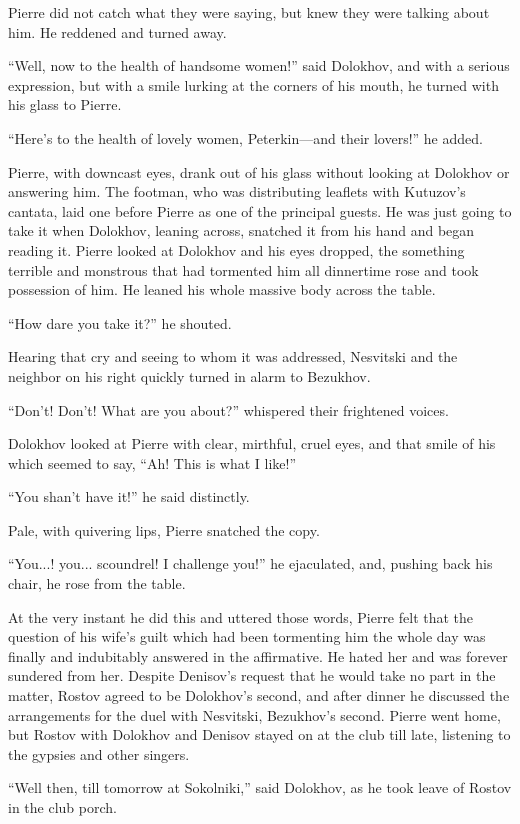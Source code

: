 Pierre did not catch what they were saying, but knew they were
talking about him. He reddened and turned away.

``Well, now to the health of handsome women!'' said Dolokhov, and
with a serious expression, but with a smile lurking at the
corners of his mouth, he turned with his glass to Pierre.

``Here's to the health of lovely women, Peterkin---and their
lovers!'' he added.

Pierre, with downcast eyes, drank out of his glass without
looking at Dolokhov or answering him. The footman, who was
distributing leaflets with Kutuzov's cantata, laid one before
Pierre as one of the principal guests. He was just going to take
it when Dolokhov, leaning across, snatched it from his hand and
began reading it. Pierre looked at Dolokhov and his eyes dropped,
the something terrible and monstrous that had tormented him all
dinnertime rose and took possession of him. He leaned his whole
massive body across the table.

``How dare you take it?'' he shouted.

Hearing that cry and seeing to whom it was addressed, Nesvitski
and the neighbor on his right quickly turned in alarm to
Bezukhov.

``Don't! Don't! What are you about?'' whispered their frightened
voices.

Dolokhov looked at Pierre with clear, mirthful, cruel eyes, and
that smile of his which seemed to say, ``Ah! This is what I
like!''

``You shan't have it!'' he said distinctly.

Pale, with quivering lips, Pierre snatched the copy.

``You...! you... scoundrel! I challenge you!'' he ejaculated,
and, pushing back his chair, he rose from the table.

At the very instant he did this and uttered those words, Pierre
felt that the question of his wife's guilt which had been
tormenting him the whole day was finally and indubitably answered
in the affirmative. He hated her and was forever sundered from
her. Despite Denisov's request that he would take no part in the
matter, Rostov agreed to be Dolokhov's second, and after dinner
he discussed the arrangements for the duel with Nesvitski,
Bezukhov's second. Pierre went home, but Rostov with Dolokhov and
Denisov stayed on at the club till late, listening to the gypsies
and other singers.

``Well then, till tomorrow at Sokolniki,'' said Dolokhov, as he
took leave of Rostov in the club porch.

